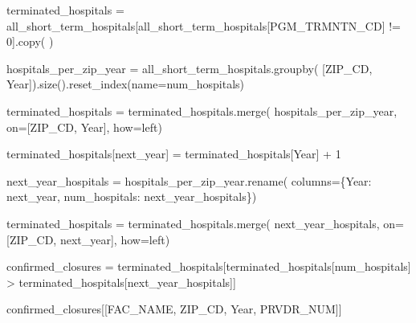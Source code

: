 \documentclass[
  letterpaper,
  DIV=11,
  numbers=noendperiod]{scrartcl}
\newenvironment{Shaded}{\begin{snugshade}}{\end{snugshade}}
\newcommand{\DecValTok}[1]{\textcolor[rgb]{0.68,0.00,0.00}{#1}}
\newcommand{\NormalTok}[1]{\textcolor[rgb]{0.00,0.23,0.31}{#1}}
\newcommand{\OperatorTok}[1]{\textcolor[rgb]{0.37,0.37,0.37}{#1}}
\newcommand{\StringTok}[1]{\textcolor[rgb]{0.13,0.47,0.30}{#1}}
\begin{document}
\begin{Shaded}
\begin{Highlighting}[]
\NormalTok{terminated\_hospitals }\OperatorTok{=}\NormalTok{ all\_short\_term\_hospitals[all\_short\_term\_hospitals[}\StringTok{\textquotesingle{}PGM\_TRMNTN\_CD\textquotesingle{}}\NormalTok{] }\OperatorTok{!=} \DecValTok{0}\NormalTok{].copy(}
\NormalTok{)}

\NormalTok{hospitals\_per\_zip\_year }\OperatorTok{=}\NormalTok{ all\_short\_term\_hospitals.groupby(}
\NormalTok{    [}\StringTok{\textquotesingle{}ZIP\_CD\textquotesingle{}}\NormalTok{, }\StringTok{\textquotesingle{}Year\textquotesingle{}}\NormalTok{]).size().reset\_index(name}\OperatorTok{=}\StringTok{\textquotesingle{}num\_hospitals\textquotesingle{}}\NormalTok{)}

\NormalTok{terminated\_hospitals }\OperatorTok{=}\NormalTok{ terminated\_hospitals.merge(}
\NormalTok{    hospitals\_per\_zip\_year, on}\OperatorTok{=}\NormalTok{[}\StringTok{\textquotesingle{}ZIP\_CD\textquotesingle{}}\NormalTok{, }\StringTok{\textquotesingle{}Year\textquotesingle{}}\NormalTok{], how}\OperatorTok{=}\StringTok{\textquotesingle{}left\textquotesingle{}}\NormalTok{)}

\NormalTok{terminated\_hospitals[}\StringTok{\textquotesingle{}next\_year\textquotesingle{}}\NormalTok{] }\OperatorTok{=}\NormalTok{ terminated\_hospitals[}\StringTok{\textquotesingle{}Year\textquotesingle{}}\NormalTok{] }\OperatorTok{+} \DecValTok{1}

\NormalTok{next\_year\_hospitals }\OperatorTok{=}\NormalTok{ hospitals\_per\_zip\_year.rename(}
\NormalTok{    columns}\OperatorTok{=}\NormalTok{\{}\StringTok{\textquotesingle{}Year\textquotesingle{}}\NormalTok{: }\StringTok{\textquotesingle{}next\_year\textquotesingle{}}\NormalTok{, }\StringTok{\textquotesingle{}num\_hospitals\textquotesingle{}}\NormalTok{: }\StringTok{\textquotesingle{}next\_year\_hospitals\textquotesingle{}}\NormalTok{\})}

\NormalTok{terminated\_hospitals }\OperatorTok{=}\NormalTok{ terminated\_hospitals.merge(}
\NormalTok{    next\_year\_hospitals, on}\OperatorTok{=}\NormalTok{[}\StringTok{\textquotesingle{}ZIP\_CD\textquotesingle{}}\NormalTok{, }\StringTok{\textquotesingle{}next\_year\textquotesingle{}}\NormalTok{], how}\OperatorTok{=}\StringTok{\textquotesingle{}left\textquotesingle{}}\NormalTok{)}

\NormalTok{confirmed\_closures }\OperatorTok{=}\NormalTok{ terminated\_hospitals[terminated\_hospitals[}\StringTok{\textquotesingle{}num\_hospitals\textquotesingle{}}\NormalTok{]}
                                          \OperatorTok{\textgreater{}}\NormalTok{ terminated\_hospitals[}\StringTok{\textquotesingle{}next\_year\_hospitals\textquotesingle{}}\NormalTok{]]}

\NormalTok{confirmed\_closures[[}\StringTok{\textquotesingle{}FAC\_NAME\textquotesingle{}}\NormalTok{, }\StringTok{\textquotesingle{}ZIP\_CD\textquotesingle{}}\NormalTok{, }\StringTok{\textquotesingle{}Year\textquotesingle{}}\NormalTok{, }\StringTok{\textquotesingle{}PRVDR\_NUM\textquotesingle{}}\NormalTok{]]}
\end{Highlighting}
\end{Shaded}
\end{document}
